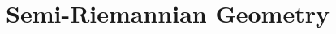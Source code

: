 \begingroup
    \ifcsname\PATH\endcsname
        \newcommand{\PATH}{books/Geometry/Riemannian_Geometry}
        \newcommand{\OLDPATH}{\PATH}
    \else
        \newcommand{\OLDPATH}{\PATH}
        \renewcommand{\PATH}{books/Geometry/Riemannian_Geometry}
    \fi
    \chapter{Semi-Riemannian Geometry}
        
    \renewcommand{\PATH}{\OLDPATH}
\endgroup